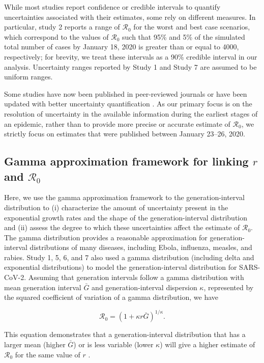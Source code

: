 \documentclass[12pt]{article}
\newcommand{\Ro}{\ensuremath{{\mathcal R}_{0}}\xspace}
\begin{document}
While most studies report confidence or credible intervals to quantify uncertainties associated with their estimates, some rely on different measures.
In particular, study 2 reports a range of \Ro for the worst and best case scenarios, which correspond to the values of \Ro such that 95\% and 5\% of the simulated total number of cases by January 18, 2020 is greater than or equal to 4000, respectively;
for brevity, we treat these intervals as a 90\% credible interval in our analysis.
Uncertainty ranges reported by Study 1 and Study 7 are assumed to be uniform ranges.

Some studies have now been published in peer-reviewed journals \citep{riou2020pattern, zhao2020preliminary} or have been updated with better uncertainty quantification \citep{readncov2}.
As our primary focus is on the resolution of uncertainty in the available information during the earliest stages of an epidemic, rather than to provide more precise or accurate estimate of \Ro, we strictly focus on estimates that were published between January 23--26, 2020.

\subsection{Gamma approximation framework for linking $r$ and $\Ro$}

Here, we use the gamma approximation framework to the generation-interval distribution \citep{nishiura2009transmission, mcbryde2009early, roberts2011early, trichereau2012estimation, nishiura2015theoretical, park2019practical} to (i) characterize the amount of uncertainty present in the exponential growth rates and the shape of the generation-interval distribution and (ii) assess the degree to which these uncertainties affect the estimate of \Ro.
The gamma distribution provides a reasonable approximation for generation-interval distributions of many diseases, including Ebola, influenza, measles, and rabies.
Study 1, 5, 6, and 7 also used a gamma distribution (including delta and exponential distributions) to model the generation-interval distribution for SARS-CoV-2.
Assuming that generation intervals follow a gamma distribution with mean generation interval $\bar G$ and generation-interval dispersion $\kappa$, represented by the squared coefficient of variation of a gamma distribution, we have
\begin{linenomath*}
\begin{equation}
\Ro = \left(1 + \kappa r \bar{G}\right)^{1/\kappa}.
\label{eq:gamma}
\end{equation}
\end{linenomath*}
This equation demonstrates that a generation-interval distribution that has a larger mean (higher $\bar{G}$) or is less variable (lower $\kappa$) will give a higher estimate of \Ro for the same value of $r$ \citep{wallinga2007generation}.
\end{document}
